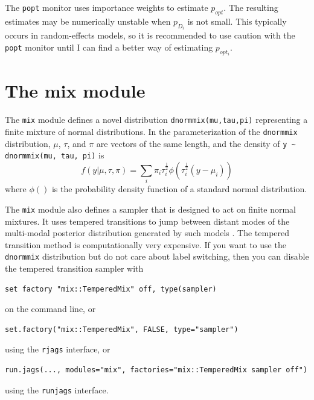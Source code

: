 \documentclass[11pt, a4paper, titlepage]{report}
\begin{document}
{The \texttt{popt} monitor uses importance weights to estimate
$p_{opt}$. The resulting estimates may be numerically unstable when
$p_{D_i}$ is not small.  This typically occurs in random-effects
models, so it is recommended to use caution with the \texttt{popt}
monitor until I can find a better way of estimating $p_{opt_i}$.

\chapter{The mix module}



The \texttt{mix} module defines a novel distribution
\verb+dnormmix(mu,tau,pi)+ representing a finite mixture of normal
distributions. In the parameterization of the \verb+dnormmix+
distribution, $\mu$, $\tau$, and $\pi$ are vectors of the same length,
and the density of \verb+y ~ dnormmix(mu, tau, pi)+ is
\[
f(y | \mu, \tau, \pi) = \sum_i \pi_i \tau_i^{\frac{1}{2}} \phi( \tau^{\frac{1}{2}}_i (y - \mu_i))
\]
where $\phi()$ is the probability density function of a standard
normal distribution.

The \texttt{mix} module also defines a sampler that is designed to act
on finite normal mixtures. It uses tempered transitions to jump
between distant modes of the multi-modal posterior distribution
generated by such models \citep{Neal94,Celeux99}. The tempered
transition method is computationally very expensive. If you want to
use the \texttt{dnormmix} distribution but do not care about label
switching, then you can disable the tempered transition sampler with
\begin{verbatim}
set factory "mix::TemperedMix" off, type(sampler)
\end{verbatim}
on the command line, or
\begin{verbatim}
set.factory("mix::TemperedMix", FALSE, type="sampler")
\end{verbatim}
using the \texttt{rjags} interface, or
\begin{verbatim}
run.jags(..., modules="mix", factories="mix::TemperedMix sampler off")
\end{verbatim}
using the \texttt{runjags} interface.


}
\end{document}
